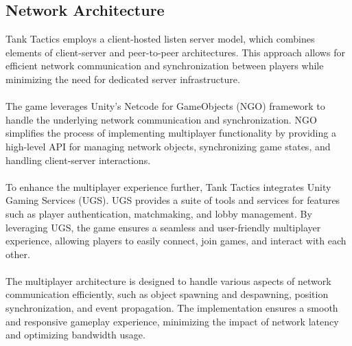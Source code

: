 \subsection{Network Architecture}
Tank Tactics employs a client-hosted listen server model, which combines elements of client-server and peer-to-peer architectures. This approach allows for efficient network communication and synchronization between players while minimizing the need for dedicated server infrastructure.
\\
\noindent
\\
The game leverages Unity's Netcode for GameObjects (NGO) framework to handle the underlying network communication and synchronization. NGO simplifies the process of implementing multiplayer functionality by providing a high-level API for managing network objects, synchronizing game states, and handling client-server interactions.
\\
\noindent
\\
To enhance the multiplayer experience further, Tank Tactics integrates Unity Gaming Services (UGS). UGS provides a suite of tools and services for features such as player authentication, matchmaking, and lobby management. By leveraging UGS, the game ensures a seamless and user-friendly multiplayer experience, allowing players to easily connect, join games, and interact with each other.
\\
\noindent
\\
The multiplayer architecture is designed to handle various aspects of network communication efficiently, such as object spawning and despawning, position synchronization, and event propagation. The implementation ensures a smooth and responsive gameplay experience, minimizing the impact of network latency and optimizing bandwidth usage.

